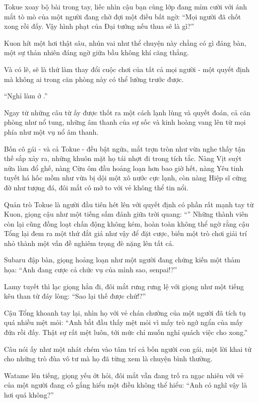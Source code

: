 \documentclass[../main.tex]{subfiles}
\begin{document}
Tokue xoay bộ bài trong tay, liếc nhìn cậu bạn cùng lớp đang mỉm cười với ánh mắt tò mò của một người đang chờ đợi một điều bất ngờ: ``Mọi người đã chốt xong rồi đấy. Vậy hình phạt của Đại tướng nếu thua sẽ là gì?''

Kuon hít một hơi thật sâu, nhún vai như thể chuyện này chẳng có gì đáng bàn, một sự thản nhiên đáng ngờ giữa bầu không khí căng thẳng.

Và có lẽ, sẽ là thứ làm thay đổi cuộc chơi của tất cả mọi người - một quyết định mà không ai trong căn phòng này có thể lường trước được.

``Nghỉ làm ở \hll.''

Ngay từ những câu từ ấy được thốt ra một cách lạnh lùng và quyết đoán, cả căn phòng như nổ tung, những âm thanh của sự sốc và kinh hoàng vang lên từ mọi phía như một vụ nổ âm thanh.

Bốn cô gái - và cả Tokue - đều bật ngửa, mắt trợn tròn như vừa nghe thấy tận thế sắp xảy ra, những khuôn mặt họ tái nhợt đi trong tích tắc. Nàng Vịt suýt nữa làm đổ ghế, nàng Cừu ôm đầu hoảng loạn hơn bao giờ hết, nàng Yêu tinh tuyết há hốc mồm như vừa bị dội một xô nước cực lạnh, còn nàng Hiệp sĩ cứng đờ như tượng đá, đôi mắt cô mở to với vẻ không thể tin nổi.

Quản trò Tokue là người đầu tiên hét lên với quyết định có phần rất mạnh tay từ Kuon, giọng cậu như một tiếng sấm đánh giữa trời quang: ``'' Những thành viên còn lại cũng đồng loạt chấn động không kém, hoàn toàn không thể ngờ rằng cậu Tổng lại đem ra một thứ đắt giá như vậy để đặt cược, biến một trò chơi giải trí nhỏ thành một vấn đề nghiêm trọng đè nặng lên tất cả.

Subaru đập bàn, giọng hoảng loạn như một người đang chứng kiến một thảm họa: ``Anh đang cược cả chức vụ của mình sao, senpai!?''

Lamy tuyết thì lạc giọng hẳn đi, đôi mắt rưng rưng lệ với giọng như một tiếng kêu than từ đáy lòng: ``Sao lại thế được chứ!?''

Cậu Tổng khoanh tay lại, nhìn họ với vẻ chán chường của một người đã tích tụ quá nhiều mệt mỏi: ``Anh bắt đầu thấy mệt mỏi vì mấy trò ngớ ngẩn của mấy đứa rồi đấy. Thật sự rất mệt luôn, tới mức chỉ muốn nghỉ quách việc cho xong.''

Câu nói ấy như một nhát chém vào tâm trí cả bốn người con gái, một lời khai tử cho những trò đùa vô tư mà họ đã từng xem là chuyện bình thường.

Watame lên tiếng, giọng yếu ớt hỏi, đôi mắt vẫn đang trố ra ngạc nhiên với vẻ của một người đang cố gắng hiểu một điều không thể hiểu: ``Anh có nghĩ vậy là hơi quá không?''
\end{document}
